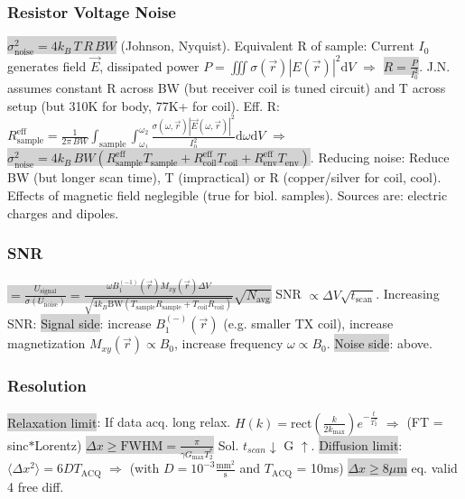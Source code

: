\documentclass[9pt]{article}
\newcommand{\grey}[1]{\setlength{\fboxsep}{0pt}\colorbox{lightgrey}{#1}}
\newcommand{\dif}{\mathrm{d}}
\begin{document}
\begin{multicols}{2}
\subsubsection{Resistor Voltage Noise} \grey{$\sigma_\mathrm{noise}^2 = 4k_B\,T\,R\,BW$} (Johnson, Nyquist). Equivalent R of sample: Current $I_0$ generates field $\vec E$, dissipated power $P = \iiint \sigma(\vec r)|E(\vec r)|^2 \dif V$ $\Rightarrow$ \grey{$R = \frac{P}{I_0^2}$}. 
J.N. assumes constant R across BW (but receiver coil is tuned circuit) and T across setup (but 310K for body, 77K+ for coil). 
Eff. R: $R_\mathrm{sample}^\mathrm{eff} = \frac{1}{2\pi\,BW} \int_\mathrm{sample}\int_{\omega_1}^{\omega_2}\frac{\sigma(\omega,\vec r)|\vec E(\omega, \vec r)|^2}{I_0^2}\dif\omega\dif V$
$\Rightarrow$ \grey{$\sigma_\mathrm{noise}^2 = 4k_B\,BW (R_\mathrm{sample}^\mathrm{eff}T_\mathrm{sample} + R_\mathrm{coil}^\mathrm{eff}T_\mathrm{coil} + R_\mathrm{env}^\mathrm{eff}T_\mathrm{env})$}.
Reducing noise: Reduce BW (but longer scan time), T (impractical) or R (copper/silver for coil, cool). Effects of magnetic field neglegible (true for biol. samples). Sources are: electric charges and dipoles.

\subsubsection{SNR}
\grey{$= \frac{U_\mathrm{signal}}{\sigma(U_\mathrm{noise})} = \frac{\omega B_1^{(-1)}(\vec r)M_{xy}(\vec r)\Delta V}{\sqrt{4k_B \mathrm{BW}(T_\mathrm{sample}R_\mathrm{sample} + T_\mathrm{coil}R_\mathrm{coil})}}\sqrt{N_\mathrm{avg}}$}
SNR $\propto \Delta V \sqrt{t_\mathrm{scan}}$. Increasing SNR: \grey{Signal side}: increase $B_1^{(-)}(\vec r)$ (e.g. smaller TX coil), increase magnetization $M_{xy}(\vec r) \propto B_0$, increase frequency $\omega \propto B_0$. \grey{Noise side}: above.

\subsubsection{Resolution}
\grey{Relaxation limit}: If data acq. long relax. $H(k) = \mathrm{rect}(\frac{k}{2k_\mathrm{max}})e^{-\frac{t}{T_2^*}}$ $\Rightarrow$ (FT = sinc$\ast$Lorentz) \grey{$\Delta x \geq \mathrm{FWHM} = \frac{\pi}{\gamma G_\mathrm{max} T_2^*}$} Sol. $t_{scan} \downarrow$ G $\uparrow$.
\grey{Diffusion limit}: $\langle \Delta x^2 \rangle = 6DT_\mathrm{ACQ}$ $\Rightarrow$ (with $D = 10^{-3}\frac{\mathrm{mm}^2}{\mathrm{s}}$ and $T_\mathrm{ACQ}$ = 10ms) \grey{$\Delta x \geq 8\mu\mathrm{m}$} eq. valid 4 free diff.


\end{multicols}
\end{document}
